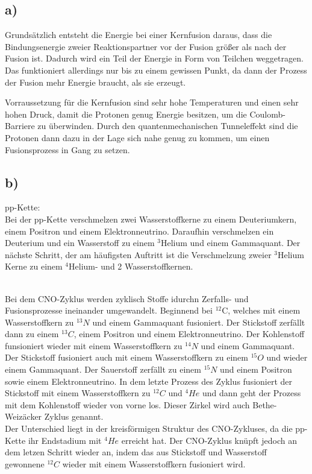 \subsection{a)}

Grundsätzlich entsteht die Energie bei einer Kernfusion daraus, dass die Bindungsenergie zweier
Reaktionspartner vor der Fusion größer als nach der Fusion ist. Dadurch wird ein Teil der Energie
in Form von Teilchen weggetragen. Das funktioniert allerdings nur bis zu einem gewissen Punkt,
da dann der Prozess der Fusion mehr Energie braucht, als sie erzeugt.

\justifying Vorraussetzung für die Kernfusion sind sehr hohe Temperaturen und einen sehr hohen Druck, damit die Protonen genug Energie besitzen,
um die Coulomb-Barriere zu überwinden. Durch den quantenmechanischen Tunneleffekt sind die Protonen 
dann dazu in der Lage sich nahe genug zu kommen, um einen Fusionsprozess in Gang zu setzen. 


\subsection{b)}

pp-Kette:\\
Bei der pp-Kette verschmelzen zwei Wasserstoffkerne zu einem Deuteriumkern, einem Positron und einem Elektronneutrino.
Daraufhin verschmelzen ein Deuterium und ein Wasserstoff zu einem $^3$Helium und einem Gammaquant.
Der nächste Schritt, der am häufigsten Auftritt ist die Verschmelzung zweier $^3$Helium Kerne zu
einem $^4$Helium- und 2 Wasserstoffkernen.


\justifying\\
Bei dem CNO-Zyklus werden zyklisch Stoffe idurchn Zerfalls- und Fusionsprozesse ineinander umgewandelt.
Beginnend bei $^{12}$C, welches mit einem Wasserstoffkern zu $^{13}N $ und einem Gammaquant fusioniert. 
Der Stickstoff zerfällt dann zu einem $^{13} C$, einem Positron und einem Elektronneutrino.
Der Kohlenstoff funsioniert wieder mit einem Wasserstoffkern zu $^{14}N $ und einem Gammaquant.
Der Stickstoff fusioniert auch mit einem Wasserstoffkern zu einem $^{15}O $ und wieder einem Gammaquant.
Der Sauerstoff zerfällt zu einem $^{15}N $ und einem Positron sowie einem Elektronneutrino.
In dem letzte Prozess des Zyklus fusioniert der Stickstoff mit einem Wasserstoffkern zu $^{12}C$ und $^4He$
und dann geht der Prozess mit dem Kohlenstoff wieder von vorne los. Dieser Zirkel wird auch Bethe-Weizäcker Zyklus genannt.\\
Der Unterschied liegt in der kreisförmigen Struktur des CNO-Zykluses, da die pp-Kette ihr Endstadium mit $^4He$ erreicht hat. Der CNO-Zyklus knüpft jedoch an dem letzen Schritt wieder
an, indem das aus Stickstoff und Wasserstoff gewonnene $^{12}C$ wieder mit einem Wasserstoffkern fusioniert wird. 


